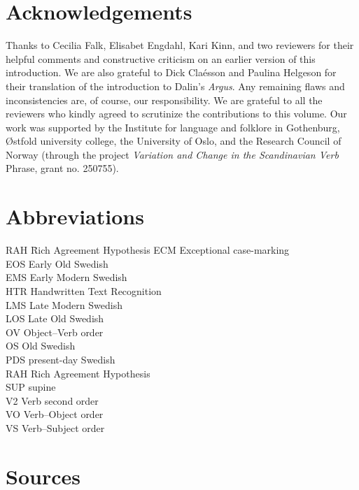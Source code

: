 \documentclass[output=paper]{langscibook}
\begin{document}
\section*{Acknowledgements}


Thanks to Cecilia Falk, Elisabet Engdahl, Kari Kinn, and two reviewers for their helpful comments and constructive criticism on an earlier version of this introduction. We are also grateful to Dick Claésson and Paulina Helgeson for their translation of the introduction to Dalin’s \textit{Argus}. Any remaining flaws and inconsistencies are, of course, our responsibility. We are grateful to all the reviewers who kindly agreed to scrutinize the contributions to this volume. Our work was supported by the Institute for language and folklore in Gothenburg, Østfold university college, the University of Oslo, and the Research Council of Norway (through the project \textit{Variation and Change in the Scandinavian Verb} Phrase, grant no. 250755).

\section*{Abbreviations}

\begin{multicols}{2}
\begin{tabbing}
RAH\hspace{1ex} \= Rich Agreement Hypothesis\kill
ECM \>  Exceptional case-marking    \\
EOS \>  Early Old Swedish\\
EMS \>  Early Modern Swedish\\
HTR \>  Handwritten Text Recognition\\
LMS \> Late Modern Swedish\\
LOS \>  Late Old Swedish\\
OV  \> Object–Verb order \\
OS  \> Old Swedish\\
PDS \>  present-day Swedish\\
RAH \>  Rich Agreement Hypothesis\\
SUP \>  supine\\
V2  \> Verb second order\\
VO  \> Verb–Object order\\
VS  \> Verb–Subject order
\end{tabbing}
\end{multicols}

\section*{Sources}
\end{document}
